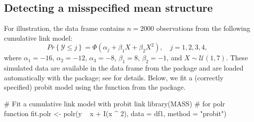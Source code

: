 \subsection{Detecting a misspecified mean structure}

For illustration, the data frame  contains $n = 2000$ observations from the following cumulative link model:
\begin{equation}
\label{eqn:quadratic}
  Pr\left\{\mathcal{Y} \le j\right\} = \Phi\left(\alpha_j + \beta_1 X + \beta_2 X ^ 2\right), \quad j = 1, 2, 3, 4,
\end{equation}
where $\alpha_1 = -16$, $\alpha_2 = -12$, $\alpha_3 = -8$, $\beta_1 = 8$, $\beta_2 = -1$, and $X \sim \mathcal{U}\left(1, 7\right)$. These simulated data are available in the  data frame from the  package and are loaded automatically with the package; see  for details. Below, we fit a (correctly specified) probit model using the  function from the  package.
\begin{example}
# Fit a cumulative link model with probit link
library(MASS)  # for polr function
fit.polr <- polr(y ~ x + I(x ^ 2), data = df1, method = "probit")
\end{example}

